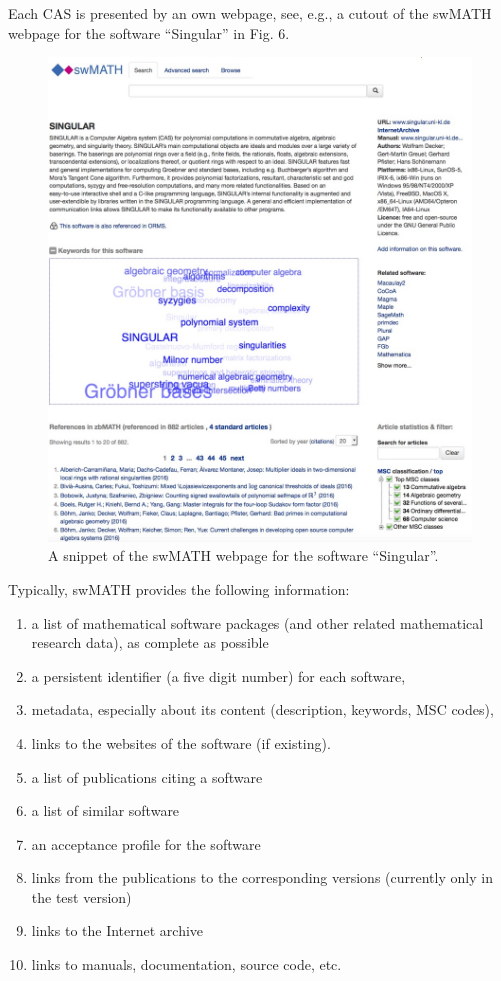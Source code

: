 \documentclass[12pt]{article}
\begin{document}
Each CAS is presented by an own webpage, see, e.g., a cutout of the swMATH webpage for the software ``Singular'' in Fig. 6.
\begin{figure}[h]
  \centering
  \includegraphics[scale=0.2]{aca6}
  \caption{A snippet of the swMATH webpage for the software ``Singular''.\label{abb_6}}
\end{figure}

Typically, swMATH provides the following information:
\begin{enumerate}
\item a list of mathematical software packages (and other related mathematical research data), as complete as possible
\item a persistent identifier (a five digit number)  for each software,
\item metadata, especially about its content (description, keywords, MSC codes),
\item links  to the websites of the software (if existing).
\item a list of publications citing a software
\item a list of similar software
\item an acceptance profile for the software
\item links from the publications to the corresponding versions (currently only in the test version)
\item links to the Internet archive
\item links to manuals, documentation, source code, etc.
\end{enumerate}
\end{document}
